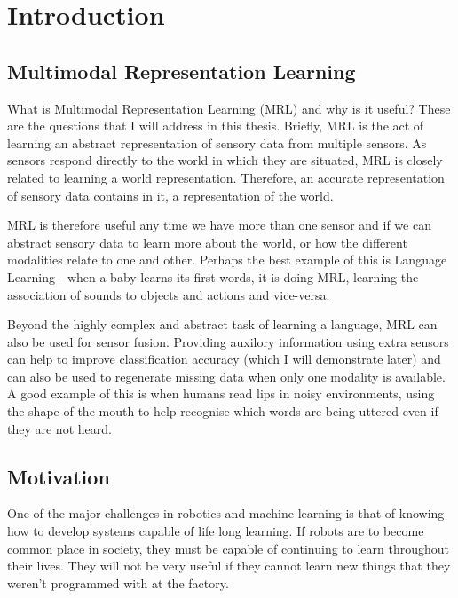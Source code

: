 
\chapter{Introduction} %

\label{Chapter1} %



\section{Multimodal Representation Learning}
What is Multimodal Representation Learning (MRL) and why is it useful? These are the questions that I will address in this thesis.
Briefly, MRL is the act of learning an abstract representation of sensory data from multiple sensors. As sensors respond directly to the world in which they are situated, MRL is closely related to learning a world representation. Therefore, an accurate representation of sensory data contains in it, a representation of the world.

MRL is therefore useful any time we have more than one sensor and if we can abstract sensory data to learn more about the world, or how the different modalities relate to one and other. Perhaps the best example of this is Language Learning - when a baby learns its first words, it is doing MRL, learning the association of sounds to objects and actions and vice-versa.

Beyond the highly complex and abstract task of learning a language, MRL can also be used for sensor fusion. Providing auxilory information using extra sensors can help to improve classification accuracy (which I will demonstrate later) and can also be used to regenerate missing data when only one modality is available.  A good example of this is when humans read lips in noisy environments, using the shape of the mouth to help recognise which words are being uttered even if they are not heard.


\section{Motivation}
One of the major challenges in robotics and machine learning is that of knowing how to develop systems capable of life long learning. If robots are to become common place in society, they must be capable of continuing to learn throughout their lives. They will not be very useful if they cannot learn new things that they weren't programmed with at the factory.

